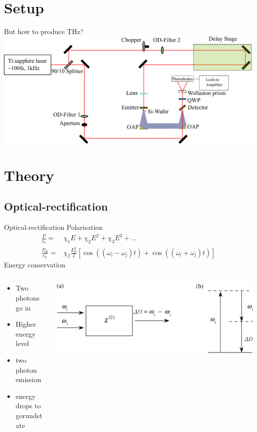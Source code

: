 \documentclass[aspectratio=1610, 9pt]{beamer}
\begin{document}
\section{Setup}

\begin{frame}{But how to produce THz?}
  \includegraphics[width=\textwidth]{images/Aufbau.pdf}
\end{frame}

\section{Theory}
\subsection{Optical-rectification}
\begin{frame}{Optical-rectification}
 Polarisation \cite{wiki_book}
  \begin{align}
    \frac{P}{\epsilon_0} =& \chi_1E + \chi_2 E^2 + \chi_3 E^3 + ... \\
    \frac{P_\text{nl}}{\epsilon_0} =& \chi_2 \frac{E_0^2}{2} \left[ \cos((\omega_\text{i} - \omega_\text{j})t) + \cos((\omega_\text{i} + \omega_\text{j})t) \right ]
  \end{align}
  Energy conservation \cite{boyd2020nonlinear}
  \begin{columns}
    \begin{column}{.4\textwidth}
      \begin{itemize}
        \item Two photons go in
        \item Higher energy level
        \item two photon emission 
        \item energy drops to gorundstate
      \end{itemize}
    \end{column}
    \begin{column}{.5\textwidth}
      \includegraphics[width=\textwidth]{images/diffrence_frequency_mixing.PNG}
    \end{column}
  \end{columns}
\end{frame}
\end{document}
